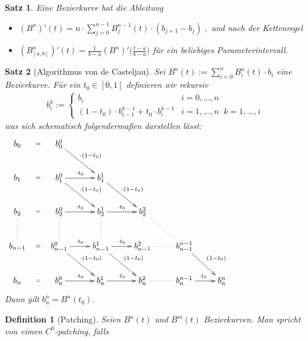 \documentclass[]{article}
\newtheorem{Definition}{Definition}
\newtheorem{Satz}{Satz}
\begin{document}
\begin{Satz}
Eine Bezierkurve hat die Ableitung
\begin{itemize}
\item $(B^n)'(t) = n \cdot \sum_{j = 0}^{n-1} B_{j}^{n-1}(t) \cdot (b_{j+1} - b_j) \; ,$ und nach der Kettenregel
\item $(B^n_{[a,b]})'(t) = \frac{1}{b-a} (B^n)' \bigl(\frac{t -a}{b-a} \bigr)$  für ein beliebiges Parameterintervall.
\end{itemize}
\end{Satz}

\begin{Satz}[Algorithmus von de Casteljau]
Sei $B^n(t) := \sum_{i = 0}^{n} B_i^n(t) \cdot  b_i$ eine Bezierkurve. Für ein 
$t_0 \in [0,1]$ definieren wir rekursiv  
\begin{align*}
b_i^k := \begin{cases}
b_i   & i= 0, \hdots,  n \\
(1-t_0) \cdot b_{i-1}^{k-1} + t_0 \cdot b_{i}^{k-1} &  i = 1, \hdots , n \; \;   k = 1, \hdots , i 
\end{cases} 
\end{align*}
was sich schematisch folgendermaßen darstellen lässt: 
\begin{align*}
\xymatrix{
b_0   \ar@{}[r]|-{=}  &  b_0^0 \ar[dr]^{\cdot(1-t_0)}  &  & & & & & &  \\
b_1   \ar@{}[r]|-{=}  &  b_1^0  \ar[r]^{\cdot t_0} \ar[dr]^{\cdot(1-t_0)} &   b_1^1  \ar[dr]^{\cdot(1-t_0)} & & & & & & \\
b_2   \ar@{}[r]|-{=}  \ar@{..}[d] &  b_2^0  \ar[r]^{\cdot t_0}  \ar@{..}[d] &   b_2^1 \ar[r]^{\cdot t_0}  \ar@{..}[d] &  b_2^2   \ar@{..}[dr]& & & & & \\
b_{n-1}   \ar@{}[r]|-{=}  &  b_{n-1}^0   \ar[r]^{\cdot t_0}  \ar[dr]^{\cdot(1-t_0)} &    b_{n-1}^1   \ar[r]^{\cdot t_0}  \ar[dr]^{\cdot(1-t_0)} &  b_{n-1}^2  \ar@{..}[r] &  
b_{n-1}^{n-1}  \ar[dr]^{\cdot(1-t_0)} & & & & \\
b_{n}   \ar@{}[r]|-{=}  &  b_{n}^0  \ar[r]^{\cdot t_0}  &    b_{n}^1   \ar[r]^{\cdot t_0}  &  b_{n}^2  \ar@{..}[r] & b_{n}^{n-1}   \ar[r]^{\cdot t_0}& b_{n}^{n}& & & 
}
\end{align*}
Dann gilt $b_n^n = B^n(t_0)$.
\end{Satz}

 



\begin{Definition}[Patching]
Seien $B^n(t)$ und $B^m(t)$  Bezierkurven. Man spricht von eimen $C^0$-patching, falls
 \end{Definition}
\end{document}
